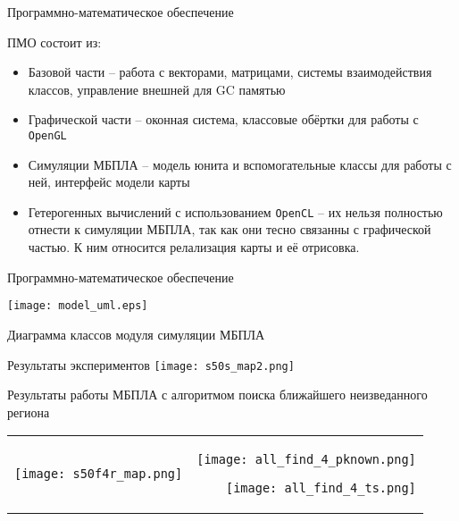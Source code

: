 \begin{tslide}{Программно-математическое обеспечение}

    ПМО состоит из:
    \begin{itemize}
        \item Базовой части -- работа с векторами, матрицами, системы
    взаимодействия классов, управление внешней для GC памятью

        \item Графической части -- оконная система, классовые обёртки
            для работы с \verb|OpenGL|

        \item Симуляции МБПЛА -- модель юнита и вспомогательные
            классы для работы с ней, интерфейс модели карты

        \item Гетерогенных вычислений с использованием \verb|OpenCL| --
            их нельзя полностью отнести к симуляции МБПЛА, так как
            они тесно связанны с графической частью. К ним относится
            релализация карты и её отрисовка.
    \end{itemize}


\end{tslide}

\begin{tslide}{Программно-математическое обеспечение}

    \centering
    \texttt{[image: model\_uml.eps]}

    Диаграмма классов модуля симуляции МБПЛА
\end{tslide}

\begin{tslide}{Результаты экспериментов}
    \vfill
    \texttt{[image: s50s\_map2.png]}
    \vfill
\end{tslide}

\begin{tslide}{Результаты работы МБПЛА с алгоритмом поиска ближайшего неизведанного региона}

    \vfill
    \centering
    \begin{tabular}{l r}
    \begin{minipage}[h]{.5\linewidth}
    \centering
    \texttt{[image: s50f4r\_map.png]}
    \end{minipage}
    &
    \begin{minipage}[h]{.5\linewidth}
    \centering
    \texttt{[image: all\_find\_4\_pknown.png]}

    \texttt{[image: all\_find\_4\_ts.png]}
    \end{minipage}
    \end{tabular}
    \vfill

\end{tslide}


